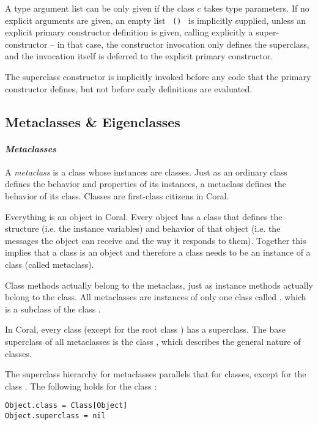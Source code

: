 A type argument list can be only given if the class $c$ takes type parameters. If no explicit arguments are given, an empty list ~\lstinline!()!~ is implicitly supplied, unless an explicit primary constructor definition is given, calling explicitly a super-constructor -- in that case, the constructor invocation only defines the superclass, and the invocation itself is deferred to the explicit primary constructor. 

The superclass constructor is implicitly invoked before any code that the primary constructor defines, but not before early definitions are evaluated. 





\subsection{Metaclasses \& Eigenclasses}
\label{sec:metaclasses}
\label{sec:eigenclasses}

\paragraph{\em Metaclasses}
A {\em metaclass} is a class whose instances are classes. Just as an ordinary class defines the behavior and properties of its instances, a metaclass defines the behavior of its class. Classes are first-class citizens in Coral. 

Everything is an object in Coral. Every object has a class that defines the structure (i.e. the instance variables) and behavior of that object (i.e. the messages the object can receive and the way it responds to them). Together this implies that a class is an object and therefore a class needs to be an instance of a class (called metaclass). 

Class methods actually belong to the metaclass, just as instance methods actually belong to the class. All metaclasses are instances of only one class called , which is a subclass of the class . 

In Coral, every class (except for the root class ) has a superclass. The base superclass of all metaclasses is the class , which describes the general nature of classes. 

The superclass hierarchy for metaclasses parallels that for classes, except for the class . The following holds for the class :
\begin{lstlisting}[deletekeywords={class}]
Object.class = Class[Object]
Object.superclass = nil
\end{lstlisting}

